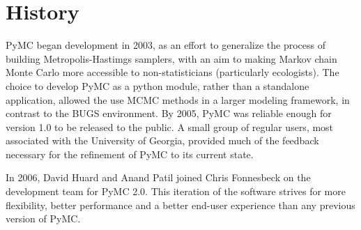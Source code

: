 
\hypertarget{history}{}
\section*{History}

PyMC began development in 2003, as an effort to generalize the process of building Metropolis-Hastimgs samplers, with an aim to making Markov chain Monte Carlo more accessible to non-statisticians (particularly ecologists). The choice to develop PyMC as a python module, rather than a standalone application, allowed the use MCMC methods in a larger modeling framework, in contrast to the BUGS environment. By 2005, PyMC was reliable enough for version 1.0 to be released to the public. A small group of regular users, most associated with the University of Georgia, provided much of the feedback necessary for the refinement of PyMC to its current state.

In 2006, David Huard and Anand Patil joined Chris Fonnesbeck on the development team for PyMC 2.0. This iteration of the software strives for more flexibility, better performance and a better end-user experience than any previous version of PyMC.



\